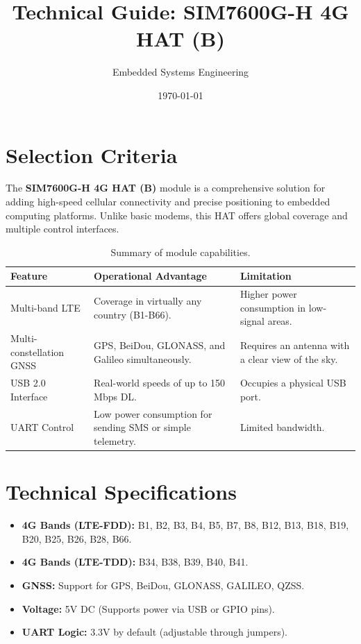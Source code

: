 \documentclass[11pt]{article}
\title{Technical Guide: SIM7600G-H 4G HAT (B)}
\author{Embedded Systems Engineering}
\date{\today}
\begin{document}
\maketitle
\tableofcontents
\newpage

\section{Selection Criteria}

The \textbf{SIM7600G-H 4G HAT (B)} module is a comprehensive solution for adding high-speed cellular connectivity and precise positioning to embedded computing platforms. Unlike basic modems, this HAT offers global coverage and multiple control interfaces.

\begin{table}[h]
    \centering
    \small
    \begin{tabular}{p{}p{}p{}}
        \toprule
        \textbf{Feature} & \textbf{Operational Advantage} & \textbf{Limitation} \\
        \midrule
        Multi-band LTE & Coverage in virtually any country (B1-B66). & Higher power consumption in low-signal areas. \\
        Multi-constellation GNSS & GPS, BeiDou, GLONASS, and Galileo simultaneously. & Requires an antenna with a clear view of the sky. \\
        USB 2.0 Interface & Real-world speeds of up to 150 Mbps DL. & Occupies a physical USB port. \\
        UART Control & Low power consumption for sending SMS or simple telemetry. & Limited bandwidth. \\
        \bottomrule
    \end{tabular}
    \caption{Summary of module capabilities.}
\end{table}

\section{Technical Specifications}

\begin{itemize}
    \item \textbf{4G Bands (LTE-FDD):} B1, B2, B3, B4, B5, B7, B8, B12, B13, B18, B19, B20, B25, B26, B28, B66.
    \item \textbf{4G Bands (LTE-TDD):} B34, B38, B39, B40, B41.
    \item \textbf{GNSS:} Support for GPS, BeiDou, GLONASS, GALILEO, QZSS.
    \item \textbf{Voltage:} 5V DC (Supports power via USB or GPIO pins).
    \item \textbf{UART Logic:} 3.3V by default (adjustable through jumpers).
\end{itemize}
\end{document}
